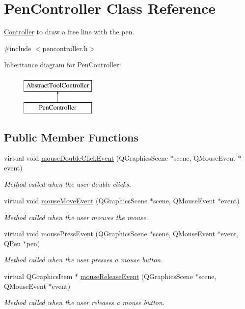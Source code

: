\hypertarget{classPenController}{}\section{Pen\+Controller Class Reference}
\label{classPenController}


\hyperlink{classController}{Controller} to draw a free line with the pen.  




{\ttfamily \#include $<$pencontroller.\+h$>$}

Inheritance diagram for Pen\+Controller\+:\begin{figure}[H]
\begin{center}
\leavevmode
\includegraphics[height=2.000000cm]{classPenController}
\end{center}
\end{figure}
\subsection*{Public Member Functions}
\begin{DoxyCompactItemize}
\item 
virtual void \hyperlink{classPenController_ad3692e4a346eef3114f683590a5f508e}{mouse\+Double\+Click\+Event} (Q\+Graphics\+Scene $\ast$scene, Q\+Mouse\+Event $\ast$event)
\begin{DoxyCompactList}\small\item\em Method called when the user double clicks. \end{DoxyCompactList}\item 
virtual void \hyperlink{classPenController_ac604ba90d1ea4bc0bb895215ffb04c3a}{mouse\+Move\+Event} (Q\+Graphics\+Scene $\ast$scene, Q\+Mouse\+Event $\ast$event)
\begin{DoxyCompactList}\small\item\em Method called when the user mouves the mouse. \end{DoxyCompactList}\item 
virtual void \hyperlink{classPenController_a8acba210ff5fdbd926005bbc01861d0d}{mouse\+Press\+Event} (Q\+Graphics\+Scene $\ast$scene, Q\+Mouse\+Event $\ast$event, Q\+Pen $\ast$pen)
\begin{DoxyCompactList}\small\item\em Method called when the user presses a mouse button. \end{DoxyCompactList}\item 
virtual Q\+Graphics\+Item $\ast$ \hyperlink{classPenController_a51a563e8f9c43e869e93a910e6752eb2}{mouse\+Release\+Event} (Q\+Graphics\+Scene $\ast$scene, Q\+Mouse\+Event $\ast$event)
\begin{DoxyCompactList}\small\item\em Method called when the user releases a mouse button. \end{DoxyCompactList}\end{DoxyCompactItemize}
